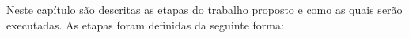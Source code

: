 
Neste capítulo são descritas as etapas do trabalho proposto e como as quais serão executadas. %
As etapas foram definidas da seguinte forma:


